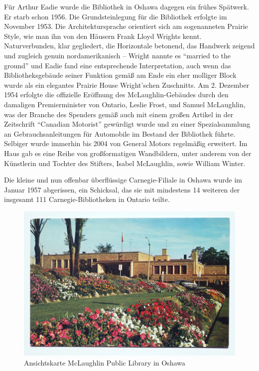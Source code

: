 \documentclass[a4paper,
fontsize=11pt,
oneside,
numbers=noperiodatend,
parskip=half-,
bibliography=totoc,
final
]{scrartcl}
\begin{document}
Für Arthur Eadie wurde die Bibliothek in Oshawa dagegen ein frühes
Spätwerk. Er starb schon 1956. Die Grundsteinlegung für die Bibliothek
erfolgte im November 1953. Die Architektursprache orientiert sich am
sogenanneten Prairie Style, wie man ihn von den Häusern Frank Lloyd
Wrights kennt. Naturverbunden, klar gegliedert, die Horizontale
betonend, das Handwerk zeigend und zugleich genuin nordamerikanisch --
Wright nannte es \enquote{married to the ground} und Eadie fand eine
entsprechende Interpretation, auch wenn das Bibliotheksgebäude seiner
Funktion gemäß am Ende ein eher molliger Block wurde als ein elegantes
Prairie House Wright'schen Zuschnitts. Am 2. Dezember 1954 erfolgte die
offizielle Eröffnung des McLaughlin-Gebäudes durch den damaligen
Premierminister von Ontario, Leslie Frost, und Samuel McLaughlin, was
der Branche des Spenders gemäß auch mit einem großen Artikel in der
Zeitschrift \enquote{Canadian Motorist} gewürdigt wurde und zu einer
Spezialsammlung an Gebrauchsanleitungen für Automobile im Bestand der
Bibliothek führte. Selbiger wurde immerhin bis 2004 von General Motors
regelmäßig erweitert. Im Haus gab es eine Reihe von großformatigen
Wandbildern, unter anderem von der Künstlerin und Tochter des Stifters,
Isabel McLaughlin, sowie William Winter.

Die kleine und nun offenbar überflüssige Carnegie-Filiale in Oshawa
wurde im Januar 1957 abgerissen, ein Schicksal, das sie mit mindestens
14 weiteren der insgesamt 111 Carnegie-Biblio\-the\-ken in Ontario teilte.

\begin{figure}[ht!]
\centering
\includegraphics[width=0.9\columnwidth]{img/oshawa-public-library.jpg}
\caption{Ansichtskarte McLaughlin Public Library in Oshawa}
\end{figure}
\end{document}
